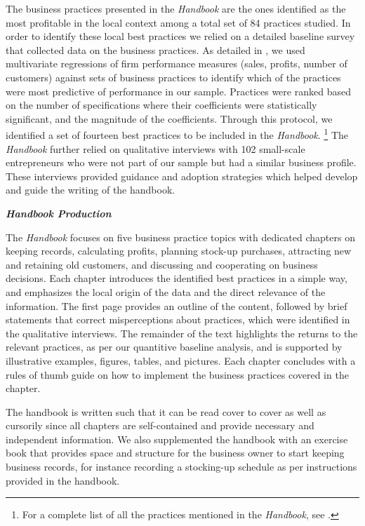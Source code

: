 \documentclass[11.5pt]{article}
\begin{document}
The business practices presented in the \emph{Handbook} are the ones identified as the most profitable in the local context among a total set of 84 practices studied. In order to identify these local best practices we relied on a detailed baseline survey that collected data on the business practices. As detailed in \citet{Dalton2018a}, we used multivariate regressions of firm performance measures (sales, profits, number of customers) against sets of business practices to identify which of the practices were most predictive of performance in our sample. Practices were ranked based on the number of specifications where their coefficients were statistically significant, and the magnitude of the coefficients. Through this protocol, we identified a set of fourteen best practices to be included in the \emph{Handbook}. \footnote{For a complete list of all the practices mentioned in the \emph{Handbook}, see \citet{Dalton2018a}.}
The \emph{Handbook} further relied on qualitative interviews with 102 small-scale entrepreneurs who were not part of our sample but had a similar business profile. These interviews provided guidance and adoption strategies which helped develop and guide the writing of the handbook.

\noindent \emph{\textbf{Handbook Production}}\

The \emph{Handbook} focuses on five business practice topics with dedicated chapters on keeping records, calculating profits, planning stock-up purchases, attracting new and retaining old customers, and discussing and cooperating on business decisions. Each chapter introduces the identified best practices in a simple way, and emphasizes the local origin of the data and the direct relevance of the information. The first page provides an outline of the content, followed by brief statements that correct misperceptions about practices, which were identified in the qualitative interviews. The remainder of the text highlights the returns to the relevant practices, as per our quantitive baseline analysis, and is supported by illustrative examples, figures, tables, and pictures. Each chapter concludes with a rules of thumb guide on how to implement the business practices covered in the chapter.

The handbook is written such that it can be read cover to cover as well as cursorily since all chapters are self-contained and provide necessary and independent information. We also supplemented the handbook with an exercise book that provides space and structure for the business owner to start keeping business records, for instance recording a stocking-up schedule as per instructions provided in the handbook.
\end{document}
